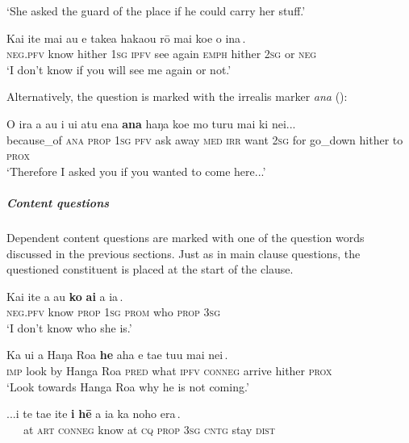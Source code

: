 \glt
‘She asked the guard of the place if he could carry her stuff.’ \textstyleExampleref{[R210.205]} 
\z

\ea\label{ex:10.71}
\gll Kai {\ꞌ}ite mai au {\ob}e take{\ꞌ}a haka{\ꞌ}ou rō mai koe {\ꞌ}o {\ꞌ}ina\,{\cb}. \\
\textsc{neg.pfv} know hither \textsc{1sg} {\db}\textsc{ipfv} see again \textsc{emph} hither \textsc{2sg} or \textsc{neg} \\

\glt 
‘I don’t know if you will see me again or not.’ \textstyleExampleref{[R210.072]} 
\z

Alternatively, the question is marked with the irrealis marker \textit{ana} ():

\ea\label{ex:10.73}
\gll {\ꞌ}O ira a au i {\ꞌ}ui atu ena {\ob}\textbf{ana} haŋa koe mo turu mai  ki nei...\,{\cb}\\
because\_of \textsc{ana} \textsc{prop} \textsc{1sg} \textsc{pfv} ask away \textsc{med} {\db}\textsc{irr} want \textsc{2sg} for go\_down hither  to \textsc{prox}\\

\glt 
‘Therefore I asked you if you wanted to come here...’ \textstyleExampleref{[R315.269]} 
\z

\subparagraph{Content questions} Dependent content questions are marked with one of the question words discussed in the previous sections. Just as in main clause questions, the questioned constituent is placed at the start of the clause.

\ea\label{ex:10.74}
\gll Kai {\ꞌ}ite a au {\ob}\textbf{ko} \textbf{ai} a ia\,{\cb}. \\
\textsc{neg.pfv} know \textsc{prop} \textsc{1sg} {\db}\textsc{prom} who \textsc{prop} \textsc{3sg} \\

\glt 
‘I don’t know who she is.’ \textstyleExampleref{[R413.356]} 
\z

\ea\label{ex:10.75}
\gll Ka u{\ꞌ}i a Haŋa Roa {\ob}\textbf{he} aha e ta{\ꞌ}e tu{\ꞌ}u mai nei\,{\cb}. \\
\textsc{imp} look by Hanga Roa {\db}\textsc{pred} what \textsc{ipfv} \textsc{conneg} arrive hither \textsc{prox} \\

\glt 
‘Look towards Hanga Roa why he is not coming.’ \textstyleExampleref{[R229.137]} 
\z

\ea\label{ex:10.76}
\gll ...{\ꞌ}i te ta{\ꞌ}e {\ꞌ}ite {\ob}\textbf{{\ꞌ}i} \textbf{hē} a ia ka noho era\,{\cb}. \\
~~~at \textsc{art} \textsc{conneg} know {\db}at \textsc{cq} \textsc{prop} \textsc{3sg} \textsc{cntg} stay \textsc{dist} \\

